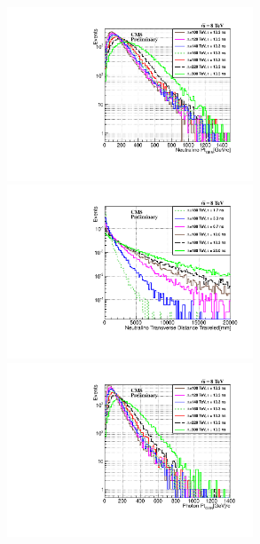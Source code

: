 \vspace{5mm}
\begin{minipage}{0.95\linewidth} 
\begin{center}
\mbox{\includegraphics[height=0.60\textwidth,width=0.55\textwidth]{THESISPLOTS/GMSB-SPS8-MODEL-Neutralino-Pt_ctau-4000-mm.pdf} %
\includegraphics[height=0.60\textwidth,width=0.55\textwidth]{THESISPLOTS/GMSB-SPS8-MODEL-Neutralino-Proper-DecayLength_Lambda-180TeV.pdf}} \\
\hspace{0.5cm}
\mbox{\includegraphics[height=0.60\textwidth,width=0.55\textwidth]{THESISPLOTS/GMSB-SPS8-MODEL-Photon-Pt_ctau-4000-mm.pdf} %
}
\end{center}
\end{minipage}
